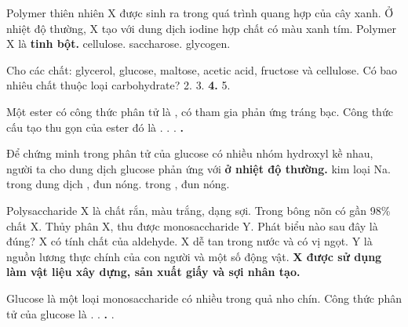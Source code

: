 \documentclass[11pt,a4paper]{article}
\begin{document}
\begin{ex}
Polymer thiên nhiên X được sinh ra trong quá trình quang hợp của cây xanh. Ở nhiệt độ thường, X tạo với dung dịch iodine hợp chất có màu xanh tím. Polymer X là
\choice
{\textbf{\color{hfRed}tinh bột.}}
{cellulose.}
{saccharose.}
{glycogen.}
\end{ex}
\begin{ex}
Cho các chất: glycerol, glucose, maltose, acetic acid, fructose và cellulose. Có bao nhiêu chất thuộc loại carbohydrate?
\choice
{2.}
{3.}
{\textbf{\color{hfRed}4.}}
{5.}
\end{ex}
\begin{ex}
Một ester có công thức phân tử là , có tham gia phản ứng tráng bạc. Công thức cấu tạo thu gọn của ester đó là
\choice
{.}
{.}
{.}
{\textbf{\color{hfRed}.}}
\end{ex}
\begin{ex}
Để chứng minh trong phân tử của glucose có nhiều nhóm hydroxyl kề nhau, người ta cho dung dịch glucose phản ứng với
\choice
{\textbf{\color{hfRed} ở nhiệt độ thường.}}
{kim loại Na.}
{ trong dung dịch , đun nóng.}
{ trong , đun nóng.}
\end{ex}
\begin{ex}
Polysaccharide X là chất rắn, màu trắng, dạng sợi. Trong bông nõn có gần 98\% chất X. Thủy phân X, thu được monosaccharide Y. Phát biểu nào sau đây là đúng?
\choice
{X có tính chất của aldehyde.}
{X dễ tan trong nước và có vị ngọt.}
{Y là nguồn lương thực chính của con người và một số động vật.}
{\textbf{\color{hfRed}X được sử dụng làm vật liệu xây dựng, sản xuất giấy và sợi nhân tạo.}}
\end{ex}
\begin{ex}
Glucose là một loại monosaccharide có nhiều trong quả nho chín. Công thức phân tử của glucose là
\choice
{.}
{.}
{\textbf{\color{hfRed}.}}
{.}
\end{ex}
\end{document}
